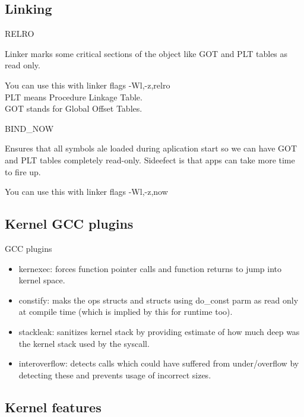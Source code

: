 \documentclass{beamer}
\begin{document}
\subsection{Linking}

\begin{frame}{RELRO}
	\begin{center}
	Linker marks some critical sections of the object like GOT and PLT tables as read only.
	\end{center}
	You can use this with linker flags -Wl,-z,relro \\
	PLT means Procedure Linkage Table. \\
	GOT stands for Global Offset Tables.
\end{frame}

\begin{frame}{BIND\_NOW}
	\begin{center}
	Ensures that all symbols ale loaded during aplication start so we can have GOT and PLT tables completely read-only. Sideefect is that apps can take more time to fire up.
	\end{center}
	You can use this with linker flags -Wl,-z,now
\end{frame}

\subsection{Kernel GCC plugins}
\begin{frame}{GCC plugins}
	\begin{itemize}
		\item kernexec: forces function pointer calls and function returns to jump into kernel space.
		\item constify: maks the ops structs and structs using do\_const parm as read only at compile time (which is implied by this for runtime too).
		\item stackleak: sanitizes kernel stack by providing estimate of how much deep was the kernel stack used by the syscall.
		\item interoverflow: detects calls which could have suffered from under/overflow by detecting these and prevents usage of incorrect sizes.
	\end{itemize}
\end{frame}

\subsection{Kernel features}
\end{document}
